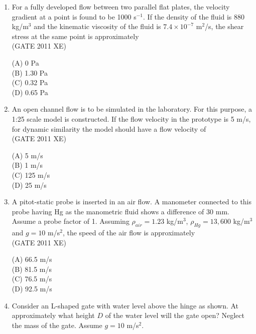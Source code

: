 \documentclass[journal,12pt,onecolumn]{IEEEtran}
\begin{document}
\begin{enumerate}
\item For a fully developed flow between two parallel flat plates, the velocity gradient at a point is found to be 1000 s$^{-1}$. If the density of the fluid is 880 kg/m$^3$ and the kinematic viscosity of the fluid is $7.4 \times 10^{-7}$ m$^2$/s, the shear stress at the same point is approximately\\

\hfill{(GATE 2011 XE)} \\
\begin{multicols}{4}
(A) 0 Pa\\
(B) 1.30 Pa\\
(C) 0.32 Pa\\
(D) 0.65 Pa
\end{multicols}

\item An open channel flow is to be simulated in the laboratory. For this purpose, a 1:25 scale model is constructed. If the flow velocity in the prototype is 5 m/s, for dynamic similarity the model should have a flow velocity of\\

\hfill{(GATE 2011 XE)} \\
\begin{multicols}{4}
(A) 5 m/s\\
(B) 1 m/s\\
(C) 125 m/s\\
(D) 25 m/s
\end{multicols}

\item A pitot-static probe is inserted in an air flow. A manometer connected to this probe having Hg as the manometric fluid shows a difference of 30 mm. Assume a probe factor of 1. Assuming $\rho_{air} = 1.23$ kg/m$^3$, $\rho_{Hg} = 13,600$ kg/m$^3$ and $g = 10$ m/s$^2$, the speed of the air flow is approximately\\

\hfill{(GATE 2011 XE)} \\
\begin{multicols}{4}
(A) 66.5 m/s\\
(B) 81.5 m/s\\
(C) 76.5 m/s\\
(D) 92.5 m/s
\end{multicols}

\newpage

\item Consider an L-shaped gate with water level above the hinge as shown. At approximately what height $D$ of the water level will the gate open? Neglect the mass of the gate. Assume $g = 10$ m/s$^2$.\\


\end{enumerate}
\end{document}
